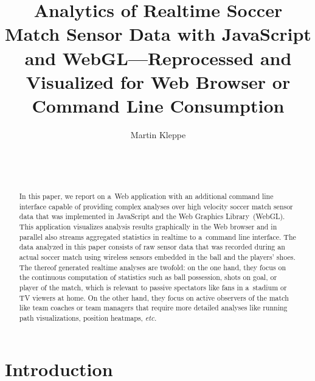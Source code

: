 \documentclass{sig-alternate}
\begin{document}
\title{Analytics of Realtime Soccer Match Sensor Data with JavaScript and WebGL---Reprocessed and Visualized for Web Browser or Command Line Consumption}

\author{
\alignauthor
Martin Kleppe\\
  \\
  \\
  \\
}
\maketitle

\begin{abstract}
In this paper, we report on a~Web application 
with an additional command line interface
capable of providing complex analyses
over high velocity soccer match sensor data
that was implemented in JavaScript
and the Web Graphics Library~(WebGL).
This application visualizes analysis results graphically
in the Web browser and in parallel also
streams aggregated statistics in realtime
to a~command line interface.
The data analyzed in this paper consists of raw sensor data
that was recorded during an actual soccer match
using wireless sensors embedded in the ball
and the players' shoes.
The thereof generated realtime analyses are twofold:
on the one hand, they focus on the continuous computation of statistics
such as ball possession, shots on goal, or player of the match,
which is relevant to passive spectators like fans in a~stadium
or TV viewers at home.
On the other hand, they focus on active observers of the match
like team coaches or team managers that require more detailed analyses
like running path visualizations, position heatmaps, \emph{etc.}
\end{abstract}


\section{Introduction}
\end{document}
